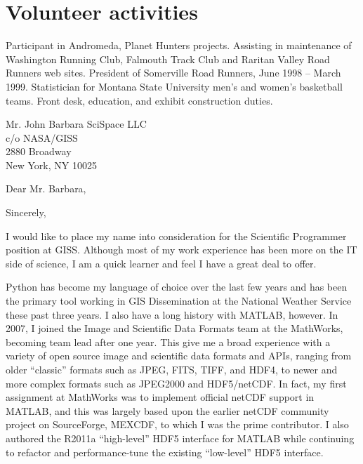 \documentclass[11pt]{moderncv}  %
\begin{document}
\section{Volunteer activities}
  {Participant in Andromeda, Planet Hunters projects.}
  {Assisting in maintenance of Washington Running Club, Falmouth
  Track Club and Raritan Valley Road Runners web sites.
   President of Somerville Road Runners, June 1998 -- March 1999.}
  {Statistician for Montana State University men's and women's basketball
  teams.}
  {Front desk, education, and exhibit construction duties.}

\clearpage
\recipient
{Mr. John Barbara}
{SciSpace LLC\\c/o NASA/GISS\\2880 Broadway\\New York, NY 10025}
\opening{Dear Mr. Barbara,}
\closing{Sincerely,}


\makelettertitle

I would like to place my name into consideration for the Scientific Programmer
position at GISS.  Although most of my work experience has been more on the IT
side of science, I am a quick learner and feel I have a great deal to offer.


Python has become my language of choice over the last few years and has been the primary tool working in GIS Dissemination at the National Weather Service these past three years.  I also have a long history with MATLAB, however.  In 2007, I joined the Image and Scientific Data Formats team at the MathWorks, becoming  team lead after one year.  This give me a broad experience with a variety of open source image and scientific data formats and APIs, ranging from older “classic” formats such as JPEG, FITS, TIFF, and HDF4, to newer and more complex formats such as JPEG2000 and HDF5/netCDF.  In fact, my first assignment at MathWorks was to implement official netCDF support in MATLAB, and this was largely based upon the earlier netCDF community project on SourceForge, MEXCDF, to which I was the prime contributor.   I also authored the R2011a “high-level” HDF5 interface for MATLAB while continuing to refactor and performance-tune the existing “low-level” HDF5 interface.
\end{document}
